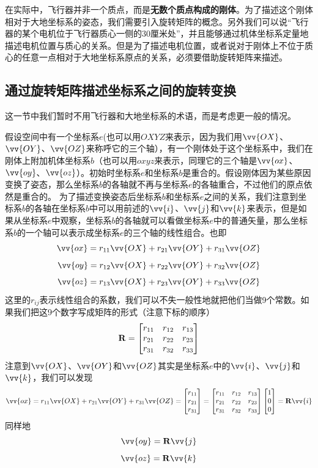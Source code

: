 \documentclass[11pt]{article}
\begin{document}
在实际中，飞行器并非一个质点，而是\textbf{无数个质点构成的刚体}。为了描述这个刚体相对于大地坐标系的姿态，我们需要引入旋转矩阵的概念。另外我们可以说“飞行器的某个电机位于飞行器质心一侧的30厘米处”，并且能够通过机体坐标系定量地描述电机位置与质心的关系。但是为了描述电机位置，或者说对于刚体上不位于质心的任意一点相对于大地坐标系原点的关系，必须要借助旋转矩阵来描述。
\subsection{通过旋转矩阵描述坐标系之间的旋转变换}\label{sec:rotationmtxdefinition}
这一节中我们暂时不用飞行器和大地坐标系的术语，而是考虑更一般的情况。

假设空间中有一个坐标系$e$(也可以用$OXYZ$来表示，因为我们用$\vv{OX}$、$\vv{OY}$、$\vv{OZ}$来称呼它的三个轴），有一个刚体处于这个坐标系中，我们在刚体上附加机体坐标系$b$（也可以用$oxyz$来表示，同理它的三个轴是$\vv{ox}$、$\vv{oy}$、$\vv{oz}$）。初始时坐标系$e$和坐标系$b$是重合的。假设刚体因为某些原因变换了姿态，那么坐标系$b$的各轴就不再与坐标系$e$的各轴重合，不过他们的原点依然是重合的。
为了描述变换姿态后坐标系$b$和坐标系$e$之间的关系，我们注意到坐标系$b$的各轴在坐标系$b$中可以用前述的$\vv{i}$、$\vv{j}$和$\vv{k}$来表示，但是如果从坐标系$e$中观察，坐标系$b$的各轴就可以看做坐标系$e$中的普通矢量，那么坐标系$b$的一个轴可以表示成坐标系$e$的三个轴的线性组合。也即
$$
\vv{ox} = r_{11}\vv{OX} + r_{21}\vv{OY} + r_{31}\vv{OZ} 
$$
$$
\vv{oy} = r_{12}\vv{OX} + r_{22}\vv{OY} + r_{32}\vv{OZ} 
$$
$$
\vv{oz} = r_{13}\vv{OX} + r_{23}\vv{OY} + r_{33}\vv{OZ} 
$$
这里的$r_{ij}$表示线性组合的系数，我们可以不失一般性地就把他们当做9个常数。如果我们把这9个数字写成矩阵的形式（注意下标的顺序）
$$
{\bf R} = \begin{bmatrix}
r_{11} & r_{12} & r_{13}\\
r_{21} & r_{22} & r_{23}\\
r_{31} & r_{32} & r_{33}
\end{bmatrix}
$$
注意到$\vv{OX}$、$\vv{OY}$和$\vv{OZ}$其实是坐标系$e$中的$\vv{i}$、$\vv{j}$和$\vv{k}$，我们可以发现
$$
\vv{ox} = r_{11}\vv{OX} + r_{21}\vv{OY} + r_{31}\vv{OZ}  = 
\begin{bmatrix}
r_{11}\\
r_{21}\\
r_{31}
\end{bmatrix} =
\begin{bmatrix}
r_{11} & r_{12} & r_{13}\\
r_{21} & r_{22} & r_{23}\\
r_{31} & r_{32} & r_{33}
\end{bmatrix}
\begin{bmatrix}
1\\
0\\
0
\end{bmatrix} = {\bf R} \vv{i}
$$
同样地
$$
\vv{oy} =   {\bf R} \vv{j}
$$
$$
\vv{oz} =   {\bf R} \vv{k}
$$
\end{document}
